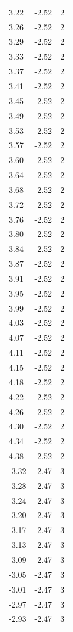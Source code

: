 \begin{longtable}{lrr}
  3.22 & -2.52 & 2 \\
  3.26 & -2.52 & 2 \\
  3.29 & -2.52 & 2 \\
  3.33 & -2.52 & 2 \\
  3.37 & -2.52 & 2 \\
  3.41 & -2.52 & 2 \\
  3.45 & -2.52 & 2 \\
  3.49 & -2.52 & 2 \\
  3.53 & -2.52 & 2 \\
  3.57 & -2.52 & 2 \\
  3.60 & -2.52 & 2 \\
  3.64 & -2.52 & 2 \\
  3.68 & -2.52 & 2 \\
  3.72 & -2.52 & 2 \\
  3.76 & -2.52 & 2 \\
  3.80 & -2.52 & 2 \\
  3.84 & -2.52 & 2 \\
  3.87 & -2.52 & 2 \\
  3.91 & -2.52 & 2 \\
  3.95 & -2.52 & 2 \\
  3.99 & -2.52 & 2 \\
  4.03 & -2.52 & 2 \\
  4.07 & -2.52 & 2 \\
  4.11 & -2.52 & 2 \\
  4.15 & -2.52 & 2 \\
  4.18 & -2.52 & 2 \\
  4.22 & -2.52 & 2 \\
  4.26 & -2.52 & 2 \\
  4.30 & -2.52 & 2 \\
  4.34 & -2.52 & 2 \\
  4.38 & -2.52 & 2 \\
  -3.32 & -2.47 & 3 \\
  -3.28 & -2.47 & 3 \\
  -3.24 & -2.47 & 3 \\
  -3.20 & -2.47 & 3 \\
  -3.17 & -2.47 & 3 \\
  -3.13 & -2.47 & 3 \\
  -3.09 & -2.47 & 3 \\
  -3.05 & -2.47 & 3 \\
  -3.01 & -2.47 & 3 \\
  -2.97 & -2.47 & 3 \\
  -2.93 & -2.47 & 3 \\

\end{longtable}
